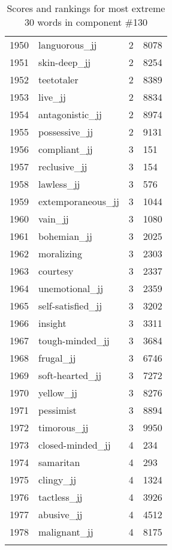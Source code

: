 \begin{longtable}[!htbp]{| rlr@{.}l |}
    1950 & languorous\_jj & 2 & 8078 \\
    1951 & skin-deep\_jj & 2 & 8254 \\
    1952 & teetotaler & 2 & 8389 \\
    1953 & live\_jj & 2 & 8834 \\
    1954 & antagonistic\_jj & 2 & 8974 \\
    1955 & possessive\_jj & 2 & 9131 \\
    1956 & compliant\_jj & 3 & 151 \\
    1957 & reclusive\_jj & 3 & 154 \\
    1958 & lawless\_jj & 3 & 576 \\
    1959 & extemporaneous\_jj & 3 & 1044 \\
    1960 & vain\_jj & 3 & 1080 \\
    1961 & bohemian\_jj & 3 & 2025 \\
    1962 & moralizing & 3 & 2303 \\
    1963 & courtesy & 3 & 2337 \\
    1964 & unemotional\_jj & 3 & 2359 \\
    1965 & self-satisfied\_jj & 3 & 3202 \\
    1966 & insight & 3 & 3311 \\
    1967 & tough-minded\_jj & 3 & 3684 \\
    1968 & frugal\_jj & 3 & 6746 \\
    1969 & soft-hearted\_jj & 3 & 7272 \\
    1970 & yellow\_jj & 3 & 8276 \\
    1971 & pessimist & 3 & 8894 \\
    1972 & timorous\_jj & 3 & 9950 \\
    1973 & closed-minded\_jj & 4 & 234 \\
    1974 & samaritan & 4 & 293 \\
    1975 & clingy\_jj & 4 & 1324 \\
    1976 & tactless\_jj & 4 & 3926 \\
    1977 & abusive\_jj & 4 & 4512 \\
    1978 & malignant\_jj & 4 & 8175 \\
    \hline
    \caption{Scores and rankings for most extreme 30 words in component \#130} \\
\end{longtable}
